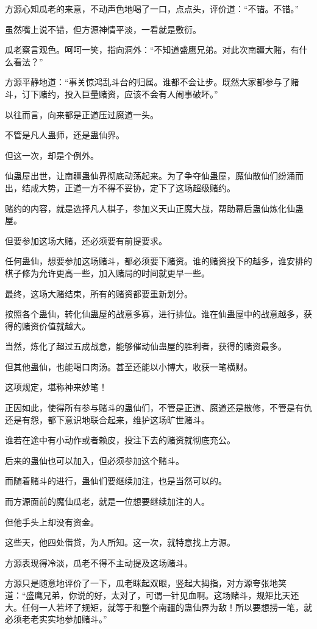 \begin{this_body}
方源心知瓜老的来意，不动声色地喝了一口，点点头，评价道：“不错。不错。”

虽然嘴上说不错，但方源神情平淡，一看就是敷衍。

瓜老察言观色。呵呵一笑，指向洞外：“不知道盛鹰兄弟。对此次南疆大赌，有什么看法？”

方源平静地道：“事关惊鸿乱斗台的归属。谁都不会让步。既然大家都参与了赌斗，订下赌约，投入巨量赌资，应该不会有人闹事破坏。”

以往而言，向来都是正道压过魔道一头。

不管是凡人蛊师，还是蛊仙界。

但这一次，却是个例外。

仙蛊屋出世，让南疆蛊仙界彻底动荡起来。为了争夺仙蛊屋，魔仙散仙们纷涌而出，结成大势，正道一方不得不妥协，定下了这场超级赌约。

赌约的内容，就是选择凡人棋子，参加义天山正魔大战，帮助幕后蛊仙炼化仙蛊屋。

但要参加这场大赌，还必须要有前提要求。

任何蛊仙，想要参加这场赌斗，都必须要下赌资。谁的赌资投下的越多，谁安排的棋子修为允许更高一些，加入赌局的时间就更早一些。

最终，这场大赌结束，所有的赌资都要重新划分。

按照各个蛊仙，转化仙蛊屋的战意多寡，进行排位。谁在仙蛊屋中的战意越多，获得的赌资价值就越大。

当然，炼化了超过五成战意，能够催动仙蛊屋的胜利者，获得的赌资最多。

但其他蛊仙，也能喝口肉汤。甚至还能以小博大，收获一笔横财。

这项规定，堪称神来妙笔！

正因如此，使得所有参与赌斗的蛊仙们，不管是正道、魔道还是散修，不管是有仇还是有怨，都下意识地联合起来，维护这场旷世赌斗。

谁若在途中有小动作或者赖皮，投注下去的赌资就彻底充公。

后来的蛊仙也可以加入，但必须参加这个赌斗。

而随着赌斗的进行，蛊仙们要继续加注，也是当然可以的。

而方源面前的魔仙瓜老，就是一位想要继续加注的人。

但他手头上却没有资金。

这些天，他四处借贷，为人所知。这一次，就特意找上方源。

方源表现得冷淡，瓜老不得不主动提及这场赌斗。

方源只是随意地评价了一下，瓜老眯起双眼，竖起大拇指，对方源夸张地笑道：“盛鹰兄弟，你说的好，太对了，可谓一针见血啊。这场赌斗，规矩比天还大。任何一人若坏了规矩，就等于和整个南疆的蛊仙界为敌！所以要想捞一笔，就必须老老实实地参加赌斗。”


\end{this_body}
